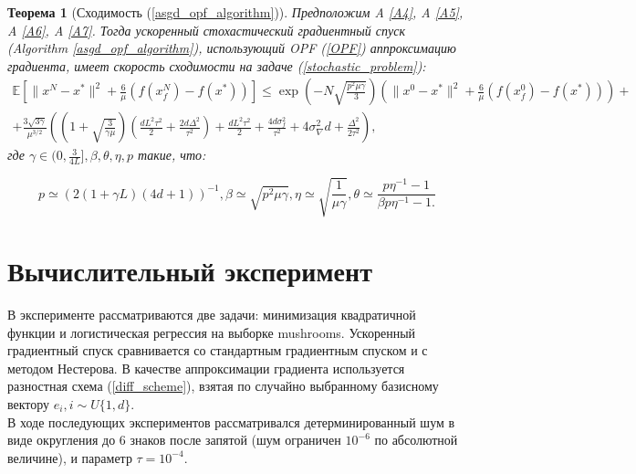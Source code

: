 \documentclass{article}
\newtheorem{theorem}{Теорема}
\begin{document}
\begin{theorem}[Сходимость (\ref{asgd_opf_algorithm})]\label{theorem2}
   Предположим A \ref{A4}, A \ref{A5}, A \ref{A6}, A \ref{A7}. Тогда ускоренный стохастический градиентный спуск (Algorithm \ref{asgd_opf_algorithm}), использующий OPF (\ref{OPF}) аппроксимацию градиента, имеет скорость сходимости на задаче (\ref{stochastic_problem}):
  \begin{equation}
   \begin{aligned}
   \mathbb{E}\left[\|x^N - x^*\|^2 + \frac{6}{\mu} (f(x_f^N) - f(x^*))\right] \leqslant \exp\left(- N\sqrt{\frac{p^2\mu\gamma}{3}}\right) \left(\|x^0 - x^*\|^2 + \frac{6}{\mu} (f(x_f^0) - f(x^*))\right) +\\+ \frac{3 \sqrt{3\gamma}}{\mu^{3/2}} \left(\left(1 + \sqrt{\frac{3}{\gamma\mu}}\right) \left(\frac{d L^2 \tau^2}{2} + \frac{2d\Delta^2}{\tau^2}\right) + \frac{d L^2 \tau^2}{2} + \frac{4 d \sigma_f^2}{\tau^2} + 4 \sigma_\nabla^2 d + \frac{\Delta^2}{2\tau^2}\right),
   \label{stochastic_opf_convergence}
   \end{aligned}
  \end{equation}
  где $\gamma \in (0, \frac{3}{4L}], \beta, \theta, \eta, p$ такие, что:

  \begin{equation}
   p \simeq (2(1 + \gamma L)(4d + 1))^{-1}, \beta \simeq \sqrt{p^2 \mu \gamma}, \eta \simeq \sqrt{\frac{1}{\mu\gamma}}, \theta \simeq \frac{p \eta^{-1} - 1}{\beta p \eta^{-1} - 1.}
  \end{equation}
\end{theorem}


\section{Вычислительный эксперимент}
В эксперименте рассматриваются две задачи: минимизация квадратичной функции и логистическая регрессия на выборке mushrooms. Ускоренный градиентный спуск сравнивается со стандартным градиентным спуском и с методом Нестерова. В качестве аппроксимации градиента используется разностная схема (\ref{diff_scheme}), взятая по случайно выбранному базисному вектору $e_i, i \sim U\{1, d\}$.\\
В ходе последующих экспериментов рассматривался детерминированный шум в виде округления до 6 знаков после запятой (шум ограничен $10^{-6}$ по абсолютной величине), и параметр $\tau = 10^{-4}$.
\end{document}
